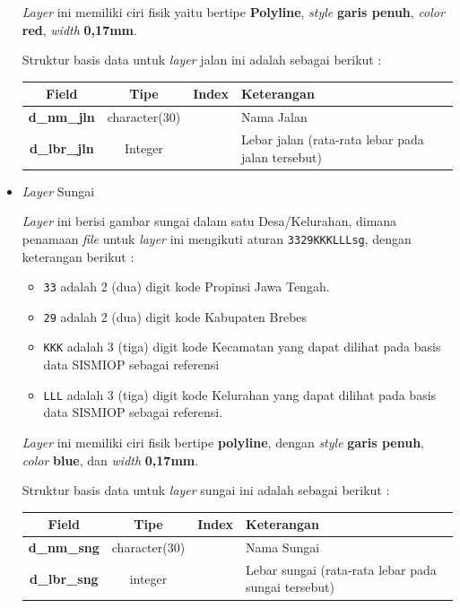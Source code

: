 \begin{itemize}
  \textit{Layer} ini memiliki ciri fisik yaitu bertipe \textbf{Polyline}, \textit{style} \textbf{garis penuh}, \textit{color} \textbf{red}, \textit{width} \textbf{0,17mm}.
  
  Struktur basis data untuk \textit{layer} jalan ini adalah sebagai berikut :
  
  \begin{table}[H]
    \centering
    \begin{tabular}{| c | c | c | p{7cm} |}
      \hline
      Field & Tipe & Index & Keterangan \\
      \hline\hline
      \textbf{d\_nm\_jln} & character(30) & & Nama Jalan \\
      \hline
      \textbf{d\_lbr\_jln} & Integer & & Lebar jalan (rata-rata lebar pada jalan tersebut) \\
      \hline
    \end{tabular}
  \end{table}
  
  \item \textit{Layer} Sungai
  
  \textit{Layer} ini berisi gambar sungai dalam satu Desa/Kelurahan, dimana penamaan \textit{file} untuk \textit{layer} ini mengikuti aturan \texttt{3329KKKLLLsg}, dengan keterangan berikut :
  
  \begin{itemize}
    \item \texttt{33} adalah 2 (dua) digit kode Propinsi Jawa Tengah.
    \item \texttt{29} adalah 2 (dua) digit kode Kabupaten Brebes
    \item \texttt{KKK} adalah 3 (tiga) digit kode Kecamatan yang dapat dilihat pada basis data SISMIOP sebagai referensi
    \item \texttt{LLL} adalah 3 (tiga) digit kode Kelurahan yang dapat dilihat pada basis data SISMIOP sebagai referensi.
  \end{itemize}
  
  \textit{Layer} ini memiliki ciri fisik bertipe \textbf{polyline}, dengan \textit{style} \textbf{garis penuh}, \textit{color} \textbf{blue}, dan \textit{width} \textbf{0,17mm}.
  
  Struktur basis data untuk \textit{layer} sungai ini adalah sebagai berikut :
  
  \begin{table}[H]
    \centering
    \begin{tabular}{| c | c | c | p{7cm} |}
      \hline
      Field & Tipe & Index & Keterangan \\
      \hline\hline
      \textbf{d\_nm\_sng} & character(30) & & Nama Sungai \\
      \hline
      \textbf{d\_lbr\_sng} & integer & & Lebar sungai (rata-rata lebar pada sungai tersebut) \\
      \hline
    \end{tabular}
  \end{table}
  

\end{itemize}

